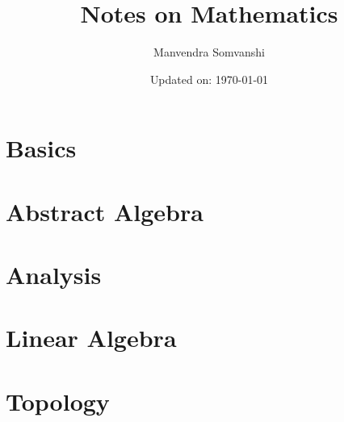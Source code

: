\documentclass[11pt,a4paper]{colorart}
\numberwithin{equation}{section}
\begin{document}
\title{\Huge Notes on Mathematics}
\author{Manvendra Somvanshi} 
\date{Updated on: \today} 
\maketitle
\tableofcontents
\newpage
\part{Basics}




\newpage
\part{Abstract Algebra}

\newpage
\part{Analysis}

\newpage
\part{Linear Algebra}
\newpage
\part{Topology}
\newpage
\end{document}
